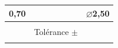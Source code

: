 \documentclass[
	11pt, %
	fleqn, %
	a4paper, %
]{LegrandOrangeBook}
\begin{document}
\begin{table}[H] %
	\centering %
	\begin{tabular}{L{0.15\textwidth} R{0.15\textwidth} R{0.15\textwidth}} %
		\toprule
		\textbf{0,70} & \textbf{} & \textbf{$\varnothing$2,50}\\
		\midrule
		  &  &  \\
		  & Tolérance $\pm$ &  \\
		  &  &  \\
		\bottomrule
	\end{tabular}
	\label{Tol} %
\end{table}
\end{document}
